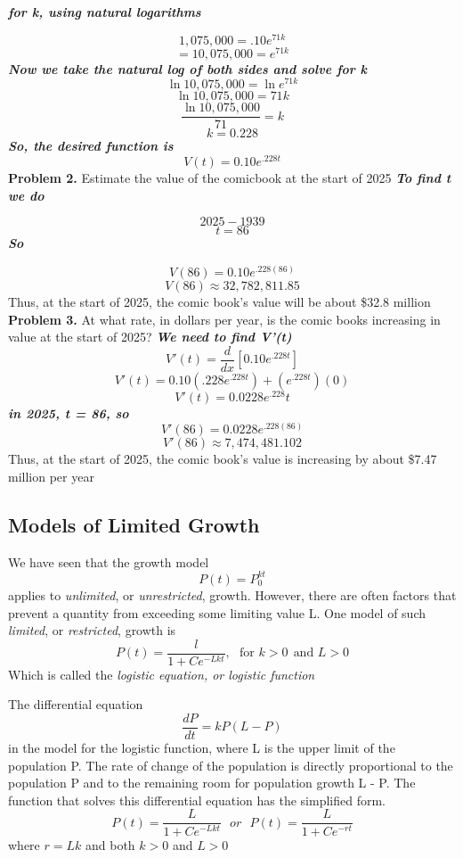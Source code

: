 \documentclass{report}
\begin{document}
\pagebreak
\noindent\textit{\textbf{for k, using natural logarithms}}

$$ 1,075,000 = .10e^{71k}$$
$$ = 10,075,000 = e^{71k}$$
\textit{\textbf{Now we take the natural log of both sides and solve for k}}
$$ \ln{10,075,000} = \ln{e^{71k}}$$
$$ \ln{10,075,000} = 71k$$
$$ \dfrac{\ln{10,075,000}}{71} = k$$
$$ k = 0.228$$
\bigbreak \noindent
\textit{\textbf{So, the desired function is}}
$$ V(t) = 0.10e^{.228t}$$
\bigbreak \noindent
\textbf{Problem 2.} Estimate the value of the comicbook at the start of 2025
\bigbreak \noindent
\textit{\textbf{To find t we do}}

$$ 2025 - 1939$$
$$ t = 86$$
\textit{\textbf{So }}

$$V(86) = 0.10e^{.228(86)}$$
$$ V(86) \approx 32,782,811.85$$
Thus, at the start of 2025, the comic book's value will be about \$32.8 million
\bigbreak \noindent
\textbf{Problem 3.} At what rate, in dollars per year, is the comic books increasing in value at the start of 2025?
\bigbreak \noindent
\textit{\textbf{We need to find V'(t)}}
$$ V'(t) = \frac{d}{dx}\left[0.10e^{.228t} \right]$$
$$ V'(t) = 0.10(.228e^{.228t}) + (e^{.228t})(0)$$
$$ V'(t) = 0.0228e^.228t$$
\textit{\textbf{in 2025, t = 86, so}}
$$ V'(86) = 0.0228e^{.228(86)}$$
$$ V'(86) \approx 7,474,481.102$$
\bigbreak \noindent
Thus, at the start of 2025, the comic book's value is increasing by about \$7.47 million per year

\pagebreak
\subsection*{Models of Limited Growth}
We have seen that the growth model	
$$ P(t) = P_0^{kt}$$
applies to \textit{unlimited}, or \textit{unrestricted}, growth. However, there are often factors that prevent a quantity from exceeding some limiting value L. One model of such \textit{limited}, or \textit{restricted}, growth is
$$ P(t) = \dfrac{l}{1 + Ce^{-Lkt}}, \ \ \ \text{for } k > 0 \ \ \text{and } L > 0$$
Which is called the \textit{logistic equation, or logistic function}
\bigbreak \noindent
\begin{mdframed}
 The differential equation 
 $$ \dfrac{dP}{dt} = kP(L - P)$$
in the model for the logistic function, where L is the upper limit of the population P. The rate of change of the population is directly proportional to the population P and to the remaining room for population growth L - P. The function that solves this differential equation has the simplified form.
$$ P(t) = \dfrac{L}{1 + Ce^{-Lkt}} \ \ \ or \ \ \ P(t) = \dfrac{L}{1 + Ce^{-rt}}$$
where $r = Lk$ and both $k > 0$ and $ L > 0$
\end{mdframed}
\bigbreak \noindent
\pagebreak
\end{document}

